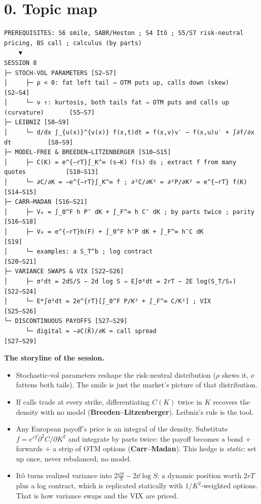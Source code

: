 \documentclass[10pt]{article}
\begin{document}
\section*{0. Topic map}
\begin{lstlisting}
PREREQUISITES: S6 smile, SABR/Heston ; S4 Itô ; S5/S7 risk-neutral pricing, BS call ; calculus (by parts)
    ▼
SESSION 8
├─ STOCH-VOL PARAMETERS [S2–S7]
│     ├─ ρ < 0: fat left tail ⇒ OTM puts up, calls down (skew)                   [S2–S4]
│     └─ ν ↑: kurtosis, both tails fat ⇒ OTM puts and calls up (curvature)       [S5–S7]
├─ LEIBNIZ [S8–S9]
│     └─ d/dx ∫_{u(x)}^{v(x)} f(x,t)dt = f(x,v)v′ − f(x,u)u′ + ∫∂f/∂x dt          [S8–S9]
├─ MODEL-FREE & BREEDEN–LITZENBERGER [S10–S15]
│     ├─ C(K) = e^{−rT}∫_K^∞ (s−K) f(s) ds ; extract f from many quotes           [S10–S13]
│     └─ ∂C/∂K = −e^{−rT}∫_K^∞ f ; ∂²C/∂K² = ∂²P/∂K² = e^{−rT} f(K)               [S14–S15]
├─ CARR–MADAN [S16–S21]
│     ├─ V₀ = ∫_0^F h P″ dK + ∫_F^∞ h C″ dK ; by parts twice ; parity             [S16–S18]
│     ├─ V₀ = e^{−rT}h(F) + ∫_0^F h″P dK + ∫_F^∞ h″C dK                          [S19]
│     └─ examples: a S_T^b ; log contract                                       [S20–S21]
├─ VARIANCE SWAPS & VIX [S22–S26]
│     ├─ σ²dt = 2dS/S − 2d log S ⇒ E∫σ²dt = 2rT − 2E log(S_T/S₀)                 [S22–S24]
│     └─ E*∫σ²dt = 2e^{rT}[∫_0^F P/K² + ∫_F^∞ C/K²] ; VIX                        [S25–S26]
└─ DISCONTINUOUS PAYOFFS [S27–S29]
      └─ digital = −∂C(K̄)/∂K ≈ call spread                                       [S27–S29]
\end{lstlisting}
\textbf{The storyline of the session.}
\begin{itemize}
\item Stochastic-vol parameters reshape the risk-neutral distribution ($\rho$ skews it, $\nu$ fattens both tails). The smile is just the market's picture of that distribution.
\item If calls trade at every strike, differentiating $C(K)$ twice in $K$ recovers the density with no model (\textbf{Breeden--Litzenberger}). Leibniz's rule is the tool.
\item Any European payoff's price is an integral of the density. Substitute $f=e^{rT}\partial^2C/\partial K^2$ and integrate by parts twice: the payoff becomes a bond $+$ forwards $+$ a strip of OTM options (\textbf{Carr--Madan}). This hedge is \emph{static}: set up once, never rebalanced, no model.
\item It\^o turns realized variance into $2\frac{\dd S}{S}-2\dd\log S$: a dynamic position worth $2rT$ plus a log contract, which is replicated statically with $1/K^2$-weighted options. That is how variance swaps and the VIX are priced.
\end{itemize}
\end{document}
